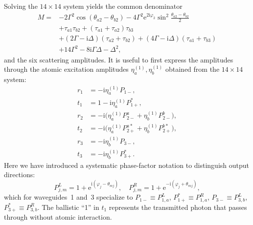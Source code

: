 \documentclass[aps,pra,reprint,superscriptaddress,nofootinbib,longbibliography,floatfix]{revtex4-2}
\newcommand{\ii}{\mathrm{i}}
\newcommand{\ee}{\mathrm{e}}
\newcommand{\Del}{\Delta}
\newcommand{\Gam}{\Gamma}
\newcommand{\ph}{\varphi}
\newcommand{\thatwo}{\theta_{a2}}
\newcommand{\thbtwo}{\theta_{b2}}
\begin{document}
Solving the $14\times14$ system yields the common denominator
\begin{align}
M =& -2\Gam^2\cos(\thatwo-\thbtwo)
     - 4\Gam^2\ee^{2\ii\ph_2}
       \sin^2\frac{\thatwo-\thbtwo}{2} \nonumber\\
   & + \tau_{a1}\tau_{b2}
     + (\tau_{a1}+\tau_{a2})\tau_{b3} \nonumber\\
   & + (2\Gam-\ii\Del)(\tau_{a2}+\tau_{b2})
     + (4\Gam-\ii\Del)(\tau_{a1}+\tau_{b3}) \nonumber\\
   & + 14\Gam^2 - 8\ii\Gam\Del - \Del^2,
\label{eq:M}
\end{align}
and the six scattering amplitudes.
It is useful to first express the amplitudes through the atomic excitation amplitudes $\eta_a^{(1)},\eta_b^{(1)}$ obtained from the $14\times14$ system:
\begin{subequations}
\label{eq:wg1_amps_eta}
\begin{align}
r_1 &= -\ii\eta_a^{(1)} P_{1-}, \label{eq:r1_eta}\\[2pt]
t_1 &= 1 - \ii\eta_a^{(1)} P_{1+}^*, \label{eq:t1_eta}\\[2pt]
r_2 &= -\ii\bigl(\eta_a^{(1)} P_{2-}^a + \eta_b^{(1)} P_{2-}^b\bigr), \label{eq:r2_eta}\\[2pt]
t_2 &= -\ii\bigl(\eta_a^{(1)} P_{2+}^{a*} + \eta_b^{(1)} P_{2+}^{b*}\bigr), \label{eq:t2_eta}\\[2pt]
r_3 &= -\ii\eta_b^{(1)} P_{3-}, \label{eq:r3_eta}\\[2pt]
t_3 &= -\ii\eta_b^{(1)} P_{3+}^*. \label{eq:t3_eta}
\end{align}
\end{subequations}
Here we have introduced a systematic phase-factor notation to distinguish output directions:
\begin{equation}
P_{j,m}^{L} = 1+\ee^{\ii(\ph_j-\theta_{mj})},\quad
P_{j,m}^{R} = 1+\ee^{-\ii(\ph_j+\theta_{mj})},
\label{eq:Pnotation_wg1}
\end{equation}
which for waveguides~1 and~3 specialize to $P_{1-}\equiv P_{1,a}^{L}$, $P_{1+}^*\equiv P_{1,a}^{R}$, $P_{3-}\equiv P_{3,b}^{L}$, $P_{3+}^*\equiv P_{3,b}^{R}$.
The ballistic ``1'' in $t_1$ represents the transmitted photon that passes through without atomic interaction.
\end{document}
